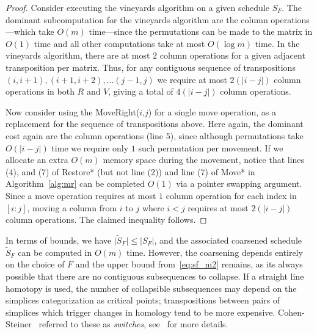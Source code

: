 \documentclass{siamart190516}
\begin{document}
\begin{proof}
Consider executing the vineyards algorithm on a given schedule $S_F$.
	The dominant subcomputation for the vineyards algorithm are the column operations---which take $O(m)$ time---since the permutations can be made to the matrix in $O(1)$ time and all other computations take at most $O(\log m)$ time. In the vineyards algorithm, there are at most $2$ column operations for a given adjacent transposition per matrix. 
	Thus, for any contiguous sequence of transpositions $(i,i+1), (i+1,i+2), \ldots (j-1,j)$ we require at most $2(\lvert i - j \rvert)$ column operations in both $R$ and $V$, giving a total of $4(\lvert i - j \rvert)$ column operations.
	
	Now consider using the MoveRight($i$,$j$) for a single move operation, as a replacement for the sequence of transpositions above. Here again, the dominant cost again are the column operations (line 5), since although permutations take $O(\lvert i - j\rvert)$ time we require only $1$ such permutation per movement. 
	If we allocate an extra $O(m)$ memory space during the movement, notice that lines (4), and (7) of Restore* (but not line (2)) and line (7) of Move* in Algorithm~\ref{alg:mr} can be completed $O(1)$ via a pointer swapping argument. 
	Since a move operation requires at most $1$ column operation for each index in $[i: j]$, moving a column from $i$ to $j$ where $i < j$ requires at most $2(\lvert i - j \rvert)$ column operations. The claimed inequality follows. 
\end{proof}
In terms of bounds, we have $\lvert \widetilde{S}_F \rvert \leq \lvert S_F \rvert$, and the associated coarsened schedule $\widetilde{S}_F$ can be computed in $O(m)$ time. 
However, the coarsening depends entirely on the choice of $F$ and the upper bound from~\ref{eq:sf_m2} remains, as its always possible that there are no contiguous subsequences to collapse. If a straight line homotopy is used, the number of collapsible subsequences may depend on the simplices categorization as critical points; transpositions between pairs of simplices which trigger  changes in homology tend to be more expensive. Cohen-Steiner~\cite{cohen2006vines} referred to these as \emph{switches}, see~\cite{edelsbrunner2000topological} for more details. 
\end{document}
